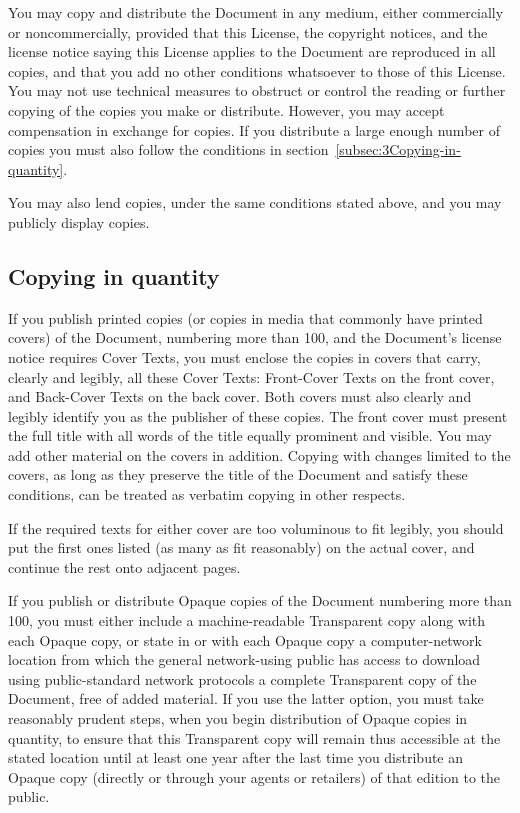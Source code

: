 {\tiny{}You may copy and distribute the Document in any medium, either
commercially or noncommercially, provided that this License, the copyright
notices, and the license notice saying this License applies to the
Document are reproduced in all copies, and that you add no other conditions
whatsoever to those of this License. You may not use technical measures
to obstruct or control the reading or further copying of the copies
you make or distribute. However, you may accept compensation in exchange
for copies. If you distribute a large enough number of copies you
must also follow the conditions in section~\ref{subsec:3Copying-in-quantity}.}{\tiny\par}

{\tiny{}You may also lend copies, under the same conditions stated
above, and you may publicly display copies.}{\tiny\par}

\subsection{Copying in quantity\label{subsec:3Copying-in-quantity}}

{\tiny{}If you publish printed copies (or copies in media that commonly
have printed covers) of the Document, numbering more than 100, and
the Document's license notice requires Cover Texts, you must enclose
the copies in covers that carry, clearly and legibly, all these Cover
Texts: Front-Cover Texts on the front cover, and Back-Cover Texts
on the back cover. Both covers must also clearly and legibly identify
you as the publisher of these copies. The front cover must present
the full title with all words of the title equally prominent and visible.
You may add other material on the covers in addition. Copying with
changes limited to the covers, as long as they preserve the title
of the Document and satisfy these conditions, can be treated as verbatim
copying in other respects.}{\tiny\par}

{\tiny{}If the required texts for either cover are too voluminous
to fit legibly, you should put the first ones listed (as many as fit
reasonably) on the actual cover, and continue the rest onto adjacent
pages.}{\tiny\par}

{\tiny{}If you publish or distribute Opaque copies of the Document
numbering more than 100, you must either include a machine-readable
Transparent copy along with each Opaque copy, or state in or with
each Opaque copy a computer-network location from which the general
network-using public has access to download using public-standard
network protocols a complete Transparent copy of the Document, free
of added material. If you use the latter option, you must take reasonably
prudent steps, when you begin distribution of Opaque copies in quantity,
to ensure that this Transparent copy will remain thus accessible at
the stated location until at least one year after the last time you
distribute an Opaque copy (directly or through your agents or retailers)
of that edition to the public.}{\tiny\par}

